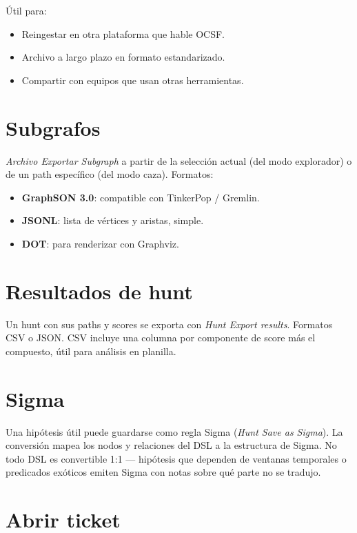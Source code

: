 Útil para:

\begin{itemize}
    \item Reingestar en otra plataforma que hable OCSF.
    \item Archivo a largo plazo en formato estandarizado.
    \item Compartir con equipos que usan otras herramientas.
\end{itemize}

\section{Subgrafos}

\emph{Archivo \textrightarrow{} Exportar \textrightarrow{}
Subgraph} a partir de la selección actual (del modo explorador) o
de un path específico (del modo caza). Formatos:

\begin{itemize}
    \item \textbf{GraphSON 3.0}: compatible con TinkerPop /
    Gremlin.
    \item \textbf{JSONL}: lista de vértices y aristas, simple.
    \item \textbf{DOT}: para renderizar con Graphviz.
\end{itemize}

\section{Resultados de hunt}

Un hunt con sus paths y scores se exporta con
\emph{Hunt \textrightarrow{} Export results}. Formatos CSV o JSON.
CSV incluye una columna por componente de score más el compuesto,
útil para análisis en planilla.

\section{Sigma}

Una hipótesis útil puede guardarse como regla Sigma
(\emph{Hunt \textrightarrow{} Save as Sigma}). La conversión mapea
los nodos y relaciones del DSL a la estructura  de
Sigma. No todo DSL es convertible 1:1 — hipótesis que dependen de
ventanas temporales o predicados exóticos emiten Sigma con notas
sobre qué parte no se tradujo.

\section{Abrir ticket}

